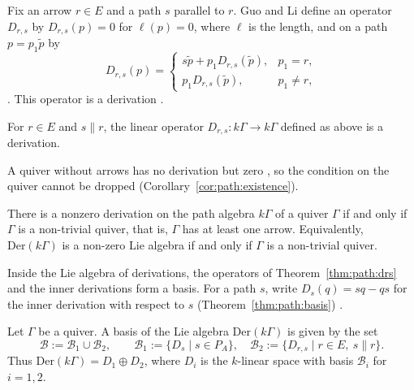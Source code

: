 Fix an arrow $r\in E$ and a path $s$ parallel to $r$. Guo and Li define an operator
$D_{r,s}$ by $D_{r,s}(p)=0$ for $\ell(p)=0$, where $\ell$ is the length, and on a path
$p=p_{1}\tilde p$ by
\begin{equation*}
D_{r,s}(p)=
\begin{cases}
s\tilde p+p_{1}D_{r,s}(\tilde p), & p_{1}=r,\\
p_{1}D_{r,s}(\tilde p), & p_{1}\neq r,
\end{cases}
\end{equation*}
\cite[pp.~553--554]{GuoLi2014}. This operator is a derivation
\cite[p.~554]{GuoLi2014}.

\begin{theorem}\label{thm:path:drs}
For $r\in E$ and $s\parallel r$, the linear operator
$D_{r,s}\colon k\Gamma\to k\Gamma$ defined as above is a derivation.
\end{theorem}

A quiver without arrows has no derivation but zero \cite[p.~554]{GuoLi2014}, so the
condition on the quiver cannot be dropped (Corollary~\ref{cor:path:existence}).

\begin{corollary}\label{cor:path:existence}
There is a nonzero derivation on the path algebra $k\Gamma$ of a quiver $\Gamma$ if
and only if $\Gamma$ is a non-trivial quiver, that is, $\Gamma$ has at least one
arrow. Equivalently, $\mathrm{Der}(k\Gamma)$ is a non-zero Lie algebra if and only
if $\Gamma$ is a non-trivial quiver.
\end{corollary}

Inside the Lie algebra of derivations, the operators of Theorem~\ref{thm:path:drs}
and the inner derivations form a basis. For a path $s$, write $D_{s}(q)=sq-qs$ for
the inner derivation with respect to $s$ (Theorem~\ref{thm:path:basis}) \cite[p.~555]{GuoLi2014}.

\begin{theorem}\label{thm:path:basis}
Let $\Gamma$ be a quiver. A basis of the Lie algebra $\mathrm{Der}(k\Gamma)$ is
given by the set
\begin{equation*}
\mathcal B:=\mathcal B_{1}\cup\mathcal B_{2},\qquad
\mathcal B_{1}:=\{D_{s}\mid s\in P_{A}\},\quad
\mathcal B_{2}:=\{D_{r,s}\mid r\in E,\ s\parallel r\}.
\end{equation*}
Thus $\mathrm{Der}(k\Gamma)=D_{1}\oplus D_{2}$, where $D_{i}$ is the $k$-linear
space with basis $\mathcal B_{i}$ for $i=1,2$.
\end{theorem}

